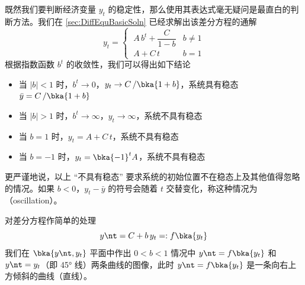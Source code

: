 
既然我们要判断经济变量 \(y_t\) 的稳定性，那么使用其表达式毫无疑问是最直白的判断方法。我们在 \ref{sec:DiffEquBasicSoln} 已经求解出该差分方程的通解
\begin{equation}
    y_t=\begin{cases}
        \ A\,b^{t}+\dfrac C{1-b} & b\neq 1\\
        \ A+C\,t & b=1
    \end{cases}
\end{equation}
根据指数函数 \(b^t\) 的收敛性，我们可以得出如下结论
\begin{itemize}
    \item 当 \(|b|<1\) 时，\(b^t\to 0\)，\(y_t\to C\,/\bka
    {1+b}\)，系统具有稳态 \(\bar y = C\,/\bka
    {1+b}\)
    \item 当 \(|b|>1\) 时，\(b^t\to \infty\)，\(y_t\to \infty\)，系统不具有稳态
    \item 当 \(b=1\) 时，\(y_t=A+C\,t\)，系统不具有稳态
    \item 当 \(b=-1\) 时，\(y_t=\bka{-1
    }^tA\)，系统不具有稳态
\end{itemize}
更严谨地说，以上 “不具有稳态” 要求系统的初始位置不在稳态上及其他值得忽略的情况。如果 \(b<0\)，\(y_t-\bar y\) 的符号会随着 \(t\) 交替变化，称这种情况为\,（oscillation）。


对差分方程作简单的处理
\begin{equation}
    y\nt = C + b\,y_t =: f\bka{y_t}
\end{equation}
我们在 \(\bka{y\nt,y_t}\) 平面中作出 \(0<b<1\) 情况中 \(y\nt=f\bka{y_t}\) 和 \(y\nt=y_t\)（即 45° 线）两条曲线的图像，此时 \(y\nt=f\bka{y_t}\) 是一条向右上方倾斜的曲线（直线）。

